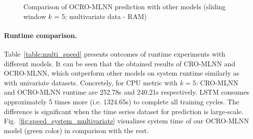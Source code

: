 \documentclass[11pt,twoside]{article}
\begin{document}
\begin{multicols}{2}
\begin{figure}[!ht]
\begin{minipage}[b]{0.33\linewidth}
  \end{minipage} 
  
  \caption{Comparison of OCRO-MLNN prediction with other models (sliding window $k$ = 5; multivariate data - RAM)} 
  \label{predict_ram_sliding5} 
\end{figure}

\paragraph{\textbf{Runtime comparison.}} Table~\ref{table:multi_speed} presents outcomes of runtime experiments with different models. It can be seen that the obtained results of CRO-MLNN and OCRO-MLNN, which outperform other models on system runtime similarly as with univariate datasets. Concretely, for CPU metric with $k = 5$: CRO-MLNN and OCRO-MLNN runtime are 252.78s and 240.21s respectively. LSTM consumes approximately 5 times more (i.e. 1324.65s) to complete all training cycles. The difference is significant when the time series dataset for prediction is large-scale. Fig.~\ref{fig:speed_system_multivariate} visualizes system time of our OCRO-MLNN model (green color) in comparison with the rest.


%	
%	
%  




\end{multicols}
\end{document}
